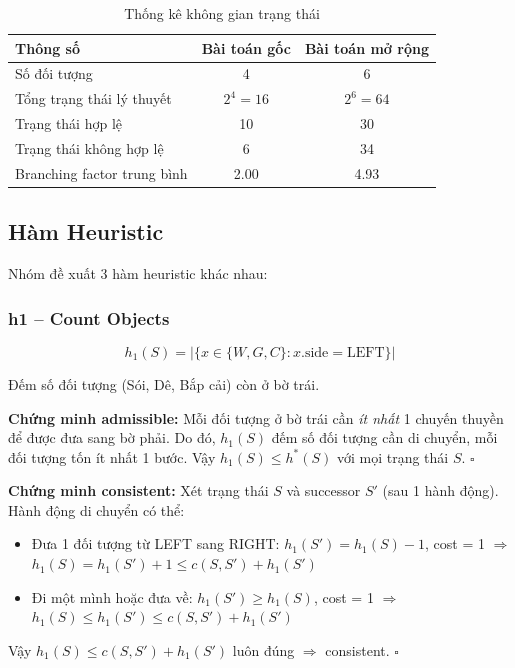\documentclass[a4paper,12pt]{article}
\begin{document}
\begin{table}[H]
\centering
\caption{Thống kê không gian trạng thái}
\label{tab:state_space}
\begin{tabular}{@{}lcc@{}}
\toprule
\textbf{Thông số} & \textbf{Bài toán gốc} & \textbf{Bài toán mở rộng} \\
\midrule
Số đối tượng & 4 & 6 \\
Tổng trạng thái lý thuyết & $2^4 = 16$ & $2^6 = 64$ \\
Trạng thái hợp lệ & 10 & 30 \\
Trạng thái không hợp lệ & 6 & 34 \\
Branching factor trung bình & 2.00 & 4.93 \\
\bottomrule
\end{tabular}
\end{table}

\subsection{Hàm Heuristic}

Nhóm đề xuất 3 hàm heuristic khác nhau:

\subsubsection{h1 -- Count Objects}

\[
    h_1(S) = |\{x \in \{W, G, C\} : x.\text{side} = \text{LEFT}\}|
\]

Đếm số đối tượng (Sói, Dê, Bắp cải) còn ở bờ trái.

\textbf{Chứng minh admissible:} Mỗi đối tượng ở bờ trái cần \textit{ít nhất} 1 chuyến thuyền để được đưa sang bờ phải. Do đó, $h_1(S)$ đếm số đối tượng cần di chuyển, mỗi đối tượng tốn ít nhất 1 bước. Vậy $h_1(S) \leq h^*(S)$ với mọi trạng thái $S$. $\square$

\textbf{Chứng minh consistent:} Xét trạng thái $S$ và successor $S'$ (sau 1 hành động). Hành động di chuyển có thể:
\begin{itemize}
    \item Đưa 1 đối tượng từ LEFT sang RIGHT: $h_1(S') = h_1(S) - 1$, cost = 1 $\Rightarrow$ $h_1(S) = h_1(S') + 1 \leq c(S, S') + h_1(S')$
    \item Đi một mình hoặc đưa về: $h_1(S') \geq h_1(S)$, cost = 1 $\Rightarrow$ $h_1(S) \leq h_1(S') \leq c(S, S') + h_1(S')$
\end{itemize}
Vậy $h_1(S) \leq c(S, S') + h_1(S')$ luôn đúng $\Rightarrow$ consistent. $\square$
\end{document}
